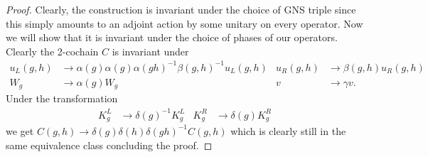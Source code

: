 \documentclass[11pt,a4paper,twoside]{article}
\numberwithin{equation}{section}
\begin{document}
	\begin{proof}
		Clearly, the construction is invariant under the choice of GNS triple since this simply amounts to an adjoint action by some unitary on every operator. Now we will show that it is invariant under the choice of phases of our operators. Clearly the 2-cochain $C$ is invariant under
		\begin{align}
			u_L(g,h)&\rightarrow \alpha(g)\alpha(g)\alpha(gh)^{-1}\beta(g,h)^{-1} u_L(g,h)&u_R(g,h)&\rightarrow \beta(g,h)u_R(g,h)\\
			W_g&\rightarrow\alpha(g)W_g&v&\rightarrow \gamma v.
		\end{align}
		Under the transformation
		\begin{align}
			K_g^L&\rightarrow \delta(g)^{-1}K_g^L&K_g^R&\rightarrow \delta(g)K_g^R
		\end{align}
		we get $C(g,h)\rightarrow \delta(g)\delta(h)\delta(gh)^{-1}C(g,h)$ which is clearly still in the same equivalence class concluding the proof.
	\end{proof}
\end{document}
